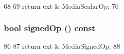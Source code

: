 \begin{DoxyCode}
68         {
69             return ext & MediaScalarOp;
70         }
\end{DoxyCode}
\hypertarget{classX86ISA_1_1MediaOpBase_a0952f8b8fd79bd9037137f3422ceb349}{
\subsubsection[{signedOp}]{\setlength{\rightskip}{0pt plus 5cm}bool signedOp () const}}
\label{classX86ISA_1_1MediaOpBase_a0952f8b8fd79bd9037137f3422ceb349}



\begin{DoxyCode}
86         {
87             return ext & MediaSignedOp;
88         }
\end{DoxyCode}


